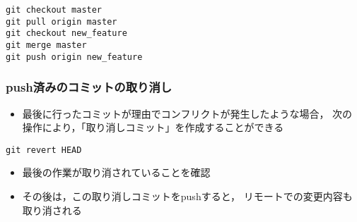 \documentclass[a4paper,twoside,twocolumn]{bxjsarticle}
\begin{document}
\begin{verbatim}
git checkout master
git pull origin master
git checkout new_feature
git merge master
git push origin new_feature
\end{verbatim}

\subsubsection{push済みのコミットの取り消し}
\label{sec-2-4-3}
\begin{itemize}
\item 最後に行ったコミットが理由でコンフリクトが発生したような場合，
次の操作により，「取り消しコミット」を作成することができる
\end{itemize}

\begin{verbatim}
git revert HEAD
\end{verbatim}

\begin{itemize}
\item 最後の作業が取り消されていることを確認
\item その後は，この取り消しコミットをpushすると，
リモートでの変更内容も取り消される
\end{itemize}
\end{document}
